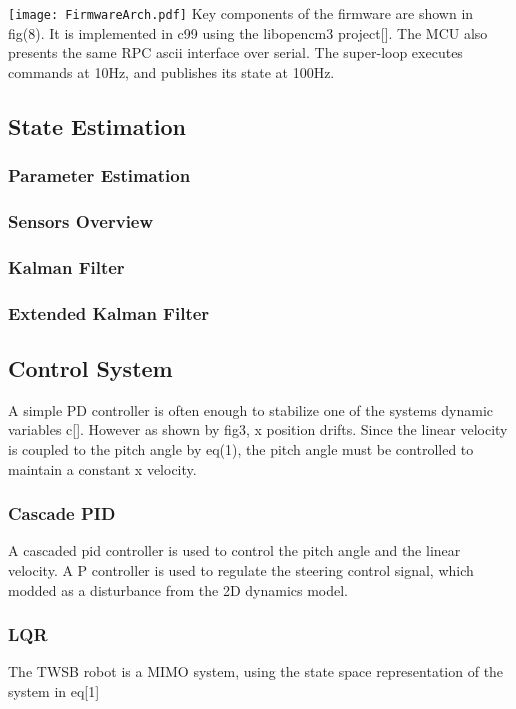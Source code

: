         \texttt{[image: FirmwareArch.pdf]}
        Key components of the firmware are shown in fig(8).
        It is implemented in c99 using the libopencm3 project[]. 
        The MCU also presents the same RPC ascii interface over serial. 
        The super-loop executes commands at 10Hz, 
        and publishes its state at 100Hz.
        \pagebreak{}
    \subsection{State Estimation}

        \subsubsection{Parameter Estimation}
        \subsubsection{Sensors Overview}
        \subsubsection{Kalman Filter}
        \subsubsection{Extended Kalman Filter}
    \subsection{Control System}
       
        A simple PD controller is often enough to stabilize one of the systems dynamic variables c[].
        However as shown by fig3, x position drifts. Since the linear velocity is coupled to the
        pitch angle by eq(1), the pitch angle must be controlled to maintain a constant x velocity. 


        \subsubsection{Cascade PID}
        A cascaded pid controller is used to control the pitch angle and the linear velocity.
        A P controller is used to regulate the steering control signal, which modded
        as a disturbance from the 2D dynamics model. 
        \subsubsection{LQR}
        The TWSB robot is a MIMO system, using the state space representation of the system in eq[1]
        



